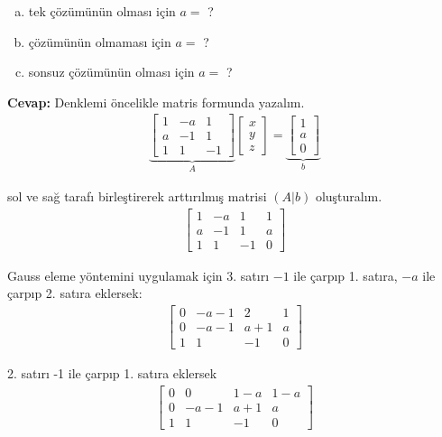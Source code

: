 \documentclass{article}
\numberwithin{equation}{section}
\begin{document}
\begin{enumerate}[(a)]
	\item tek çözümünün olması için $a=$ ?
	\item çözümünün olmaması için $a=$ ?
	\item sonsuz çözümünün olması için $a=$ ?
\end{enumerate}
\textbf{Cevap: }
Denklemi öncelikle matris formunda yazalım. 
%
\begin{align}
	\underbrace{\left[\begin{matrix}
		1 & -a & 1 \\
		a & -1 & 1 \\
		1 &  1 & -1 
		\end{matrix}\right]}_{A}\left[\begin{matrix}
	x \\
	y \\
	z
	\end{matrix}\right] = \underbrace{\left[\begin{matrix}
		1 \\
		a \\
		0
		\end{matrix}\right]}_{b}
\end{align}

sol ve sağ tarafı birleştirerek arttırılmış matrisi $(A|b)$ oluşturalım. 
%
\begin{align}
\left[\begin{array}{ccc|c}
1 & -a & 1  &1 \\
a & -1 & 1  &a\\
1 &  1 & -1 &0
\end{array}\right]
\end{align}

Gauss eleme yöntemini uygulamak için 3. satırı $-1$ ile çarpıp 1. satıra, $-a$ ile çarpıp 2. satıra eklersek: 
%
\begin{align}
\left[\begin{array}{ccc|c}
0 & -a-1 & 2  & 1 \\
0 & -a-1   & a+1  & a\\
1 &  1   & -1 & 0
\end{array}\right]
\end{align}

2. satırı -1 ile çarpıp 1. satıra eklersek
%
\begin{align}
\left[\begin{array}{ccc|c}
0 & 0      & 1-a  & 1-a \\
0 & -a-1   & a+1  & a\\
1 &  1   & -1 & 0
\end{array}\right]
\end{align}
%
\end{document}
